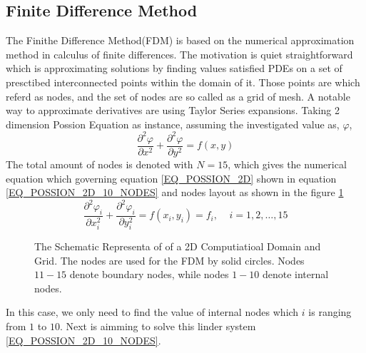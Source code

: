 \subsection{Finite Difference Method}
The Finithe Difference Method(FDM) is based on the numerical approximation method in calculus of finite differences.
The motivation is quiet straightforward which is approximating solutions by finding values satisfied PDEs on a set of 
presctibed interconnected points within the domain of it. Those points are which referd as nodes, and the set of nodes 
are so called as a grid of mesh.
A notable way to approximate derivatives are using 
Taylor Series expansions.
Taking 2 dimension Possion Equation as instance, assuming the investigated value as, $\varphi$,
\begin{equation}\label{EQ_POSSION_2D}
  \frac{
    \partial ^ 2 \varphi  
  }{
    \partial x ^ 2
  } +
  \frac{
    \partial ^ 2 \varphi  
  }{
    \partial y ^ 2
  }
  =  f(x,y)
\end{equation}
The total amount of nodes is denoted with $N = 15$, which gives the numerical equation which governing 
equation \ref{EQ_POSSION_2D} 
shown in 
equation \ref{EQ_POSSION_2D_10_NODES} and nodes layout as shown in the 
figure \ref{FIG_POSSION_2D_10_NODES}
\begin{equation}\label{EQ_POSSION_2D_10_NODES}
  \frac{
    \partial ^ 2 \varphi_i
  }{
    \partial x_i ^ 2
  } +
  \frac{
    \partial ^ 2 \varphi_i
  }{
    \partial y_i ^ 2
  }
  =  f(x_i,y_i) = f_i, \:\:\:\:\: i = 1,2,\dots,15
\end{equation}
\begin{figure}[htbp]
  \centering
  
  \caption{The Schematic Representa of of a 2D Computiatioal Domain and Grid. The nodes are used for the FDM by solid circles. 
  Nodes $11-15$ denote boundary nodes, while nodes $1-10$ denote internal nodes.}
  \label{FIG_POSSION_2D_10_NODES}
\end{figure}
In this case, we only need to find the value of internal nodes which $i$ is ranging from $1$ to $10$.
Next is aimming to solve this linder system \ref{EQ_POSSION_2D_10_NODES}.


